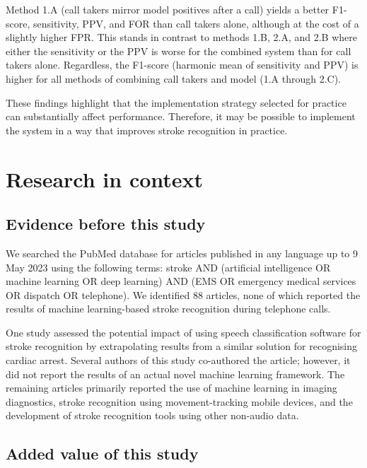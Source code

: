 {\begin{table}[h]
{\begin{tabular}{c|c|cc|cc|cc}
        \bottomrule
    \end{tabular}%
    }
\end{table}

Method 1.A (call takers mirror model positives after a call) yields a better F1-score, sensitivity, PPV, and FOR than call takers alone, although at the cost of a slightly higher FPR. This stands in contrast to methods 1.B, 2.A, and 2.B where either the sensitivity or the PPV is worse for the combined system than for call takers alone. Regardless, the F1-score (harmonic mean of sensitivity and PPV) is higher for all methods of combining call takers and model (1.A through 2.C).

These findings highlight that the implementation strategy selected for practice can substantially affect performance. Therefore, it may be possible to implement the system in a way that improves stroke recognition in practice.


\section{Research in context}

\subsection{Evidence before this study}

We searched the PubMed database for articles published in any language up to 9 May 2023 using the following terms: stroke AND (artificial intelligence OR machine learning OR deep learning) AND (EMS OR emergency medical services OR dispatch OR telephone). We identified 88 articles, none of which reported the results of machine learning-based stroke recognition during telephone calls.

One study assessed the potential impact of using speech classification software for stroke recognition by extrapolating results from a similar solution for recognising cardiac arrest. Several authors of this study co-authored the article; however, it did not report the results of an actual novel machine learning framework. The remaining articles primarily reported the use of machine learning in imaging diagnostics, stroke recognition using movement-tracking mobile devices, and the development of stroke recognition tools using other non-audio data.

\subsection{Added value of this study}

}
